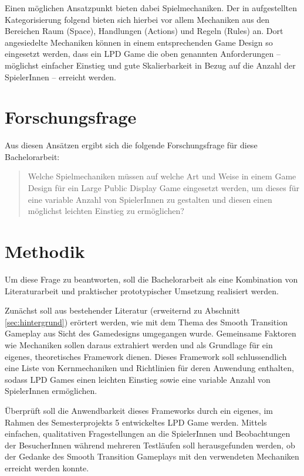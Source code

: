 Einen möglichen Ansatzpunkt bieten dabei Spielmechaniken. Der in \cite{Schell2008} aufgestellten Kategorisierung folgend bieten sich hierbei vor allem Mechaniken aus den Bereichen Raum (Space), Handlungen (Actions) und Regeln (Rules) an. Dort angesiedelte Mechaniken können in einem entsprechenden Game Design so eingesetzt werden, dass ein LPD Game die oben genannten Anforderungen -- möglichst einfacher Einstieg und gute Skalierbarkeit in Bezug auf die Anzahl der SpielerInnen -- erreicht werden.

\section{Forschungsfrage}

Aus diesen Ansätzen ergibt sich die folgende Forschungsfrage für diese Bachelorarbeit:

\begin{quote}
Welche Spielmechaniken müssen auf welche Art und Weise in einem Game Design für ein Large Public Display Game eingesetzt werden, um dieses für eine variable Anzahl von SpielerInnen zu gestalten und diesen einen möglichst leichten Einstieg zu ermöglichen?
\end{quote}

\section{Methodik}

Um diese Frage zu beantworten, soll die Bachelorarbeit als eine Kombination von Literaturarbeit und praktischer \bzw prototypischer Umsetzung realisiert werden.

Zunächst soll aus bestehender Literatur (erweiternd zu Abschnitt \ref{sec:hintergrund}) erörtert werden, wie mit dem Thema des Smooth Transition Gameplay aus Sicht des Gamedesigns umgegangen wurde. Gemeinsame Faktoren wie Mechaniken sollen daraus extrahiert werden und als Grundlage für ein eigenes, theoretisches Framework dienen. Dieses Framework soll schlussendlich eine Liste von Kernmechaniken und Richtlinien für deren Anwendung enthalten, sodass LPD Games einen leichten Einstieg sowie eine variable Anzahl von SpielerInnen ermöglichen.

Überprüft soll die Anwendbarkeit dieses Frameworks durch ein eigenes, im Rahmen des Semesterprojekts 5 entwickeltes LPD Game werden. Mittels einfachen, qualitativen Fragestellungen an die SpielerInnen und Beobachtungen der BesucherInnen während mehreren Testläufen soll herausgefunden werden, ob der Gedanke des Smooth Transition Gameplays mit den verwendeten Mechaniken erreicht werden konnte.


